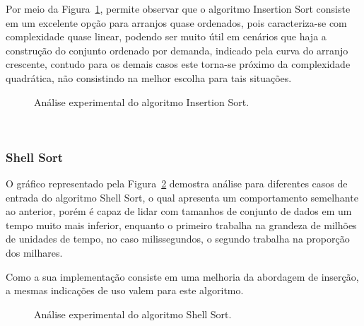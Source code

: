 \documentclass[conference]{IEEEtran}
\begin{document}
Por meio da Figura~\ref{image: graph-insertion}, permite observar que o algoritmo Insertion Sort consiste em um excelente opção para arranjos quase ordenados, pois caracteriza-se com complexidade quase linear, podendo ser muito útil em cenários que haja a construção do conjunto ordenado por demanda, indicado pela curva do arranjo crescente, contudo para os demais casos este torna-se próximo da complexidade quadrática, não consistindo na melhor escolha para tais situações.

\begin{figure}

\centering
{}
\caption{Análise experimental do algoritmo Insertion Sort.}
\label{image: graph-insertion}
\end{figure}
~\\
\subsubsection{Shell Sort}
O gráfico representado pela Figura~\ref{image: graph-shell} demostra análise para diferentes casos de entrada do algoritmo Shell Sort, o qual apresenta um comportamento semelhante ao anterior, porém é capaz de lidar com tamanhos de conjunto de dados em um tempo muito mais inferior, enquanto o primeiro trabalha na grandeza de milhões de unidades de tempo, no caso milissegundos, o segundo trabalha na proporção dos milhares. 

Como a sua implementação consiste em uma melhoria da abordagem de inserção, a mesmas indicações de uso valem para este algoritmo.


\begin{figure}

\centering
{}
\caption{Análise experimental do algoritmo Shell Sort.}
\label{image: graph-shell}
\end{figure}
~\\
\end{document}
